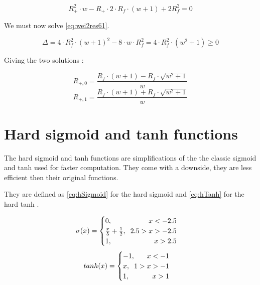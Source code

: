 \begin{equation}\label{eq:wei2res61}
  R_+^2\cdot w - R_+\cdot 2\cdot R_f \cdot(w+1) + 2R_f^2 = 0
\end{equation}

We must now solve \cref{eq:wei2res61}.

\begin{equation}\label{eq:wei2res61}
  \Delta = 4\cdot R_f^2\cdot(w+1)^2-8\cdot w\cdot R_f^2 = 4\cdot R_f^2\cdot(w^2+1) \ge 0
\end{equation}

Giving the two solutions :

\begin{equation}\label{eq:wei2res62}
  R_{+,0}=\frac{R_f\cdot(w+1)-R_f\cdot\sqrt{w^2+1}}{w}
\end{equation}
\begin{equation}\label{eq:wei2res63}
  R_{+,1}=\frac{R_f\cdot(w+1)+R_f\cdot\sqrt{w^2+1}}{w}
\end{equation}

\section{Hard sigmoid and \ac{tanh} functions}\label{apsec:hardFunc}

The hard sigmoid and \ac{tanh} functions are simplifications of the the classic sigmoid and \ac{tanh} used for faster computation. They come with a downside, they are less efficient then their original functions.

They are defined as \cref{eq:hSigmoid} for the hard sigmoid and \cref{eq:hTanh} for the hard \ac{tanh} \cite{hSigmoid, hTanh}.


\begin{equation}\label{eq:hSigmoid}
  \sigma (x) =
  \begin{cases}
    0, \hfill x< -2.5\\
    \frac{x}{5}+\frac{1}{2}, \hspace{0.2cm} 2.5>x>-2.5\\
    1, \hfill x> 2.5\\
  \end{cases}
\end{equation}
\begin{equation}\label{eq:hTanh}
  tanh(x) =
  \begin{cases}
    -1, \hfill x<-1\\
    x, \hspace{0.2cm} 1>x>-1\\
    1, \hfill x>1\\
  \end{cases}
\end{equation}
